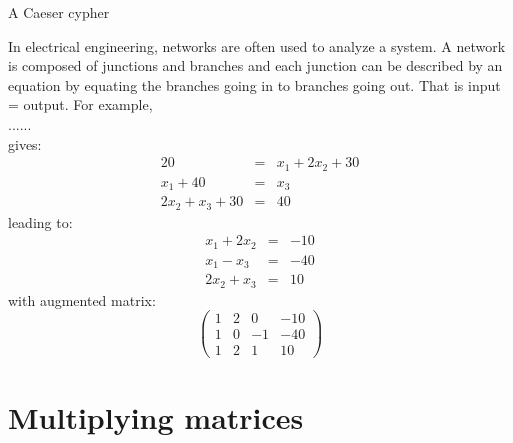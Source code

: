 \documentclass{ximera}
\begin{document}
\begin{example}[Cryptography]
  A Caeser cypher
\end{example}





\begin{example}[Networks]
In electrical engineering, networks are often used to analyze a system. A network is composed of junctions and branches and each junction can be described by an equation by equating the branches going in to branches going out. That is input = output. For example,\\

......\\

gives:
\begin{eqnarray*}
20 &=& x_{1} + 2x_{2} + 30\\
x_{1} + 40 &=& x_{3}\\
2x_{2} + x_{3} + 30 &=& 40
\end{eqnarray*}
leading to:
\begin{eqnarray*}
x_{1}+2x_{2} &=& -10\\
x_{1} -x_{3}&=& -40\\
2x_{2} + x_{3}  &=& 10
\end{eqnarray*}
with augmented matrix:
\[\left(\begin{array}{ccc|c}
1 & 2 & 0 & -10\\
1 & 0 & -1 & -40\\
1 & 2 & 1 & 10
\end{array}\right)\]
\end{example}













\section{Multiplying matrices}
\end{document}
